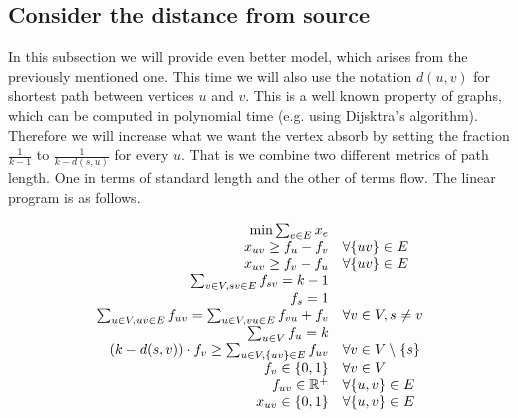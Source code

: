 \documentclass{article}
\theoremstyle{plain}
\theoremstyle{plain}
\theoremstyle{remark}
\begin{document}
%		

	\subsection{Consider the distance from source}
	
	In this subsection we will provide even better model, which arises from the previously mentioned one. This time we will also use the notation $d(u,v)$ for shortest path between vertices $u$ and $v$. This is a well known property of graphs, which can be computed in polynomial time (e.g. using Dijsktra's algorithm). Therefore we will increase what we want the vertex absorb by setting the fraction $\frac{1}{k-1}$ to $\frac{1}{k - d(s,u)}$ for every $u$. That is we combine two different metrics of path length. One in terms of standard length and the other of terms flow. The linear program is as follows.
	
	\begin{equation}
		\begin{array}{r l}
			\min \sum_{e \in E} x_e \\
			x_{uv} \geq f_u - f_v & \forall \{uv\} \in E\\
			x_{uv} \geq f_v - f_u & \forall \{uv\} \in E\\
			\sum_{v \in V, sv \in E} f_{sv} = k-1 \\
			f_s = 1 \\
			\sum_{u \in V, uv \in E} f_{uv} = \sum_{u \in V, vu \in E} f_{vu} + f_v & \forall v \in V, s \neq v \\
			\sum_{u \in V} f_u = k \\
			(k-d(s,v)) \cdot f_{v} \geq \sum_{u \in V, \{uv\} \in E} f_{uv} & \forall v \in V \setminus \{s\} \\
			f_v \in \{0,1\} & \forall v \in V \\
			f_{uv} \in \mathbb{R}^+ & \forall \{u,v\} \in E \\
			x_{uv} \in \{0,1\} & \forall \{u,v\} \in E
		\end{array}
	\end{equation}
\end{document}
